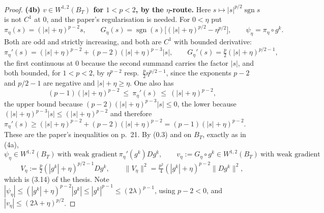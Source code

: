 \begin{proof}
\textbf{(4b) $v\in W^{1,2}(B_T)$ for $1<p<2$, by the $\eta$-route.}  Here
$s\mapsto|s|^{p/2}\operatorname{sgn}s$ is not $C^1$ at $0$, and the paper's
regularisation is needed.  For $0<\eta$ put
\[
\pi_\eta(s)=(|s|+\eta)^{p-2}s,\qquad
G_\eta(s)=\operatorname{sgn}(s)\bigl[(|s|+\eta)^{p/2}-\eta^{p/2}\bigr],
\qquad
\psi_\eta=\pi_\eta\circ g^k .
\]
Both are odd and strictly increasing, and both are $C^1$ with bounded
derivative:
\[
\pi_\eta'(s)=(|s|+\eta)^{p-2}+(p-2)(|s|+\eta)^{p-3}|s|,
\qquad
G_\eta'(s)=\tfrac p2(|s|+\eta)^{p/2-1},
\]
the first continuous at $0$ because the second summand carries the factor $|s|$,
and both bounded, for $1<p<2$, by $\eta^{p-2}$ resp.\ $\tfrac p2\eta^{p/2-1}$,
since the exponents $p-2$ and $p/2-1$ are negative and $|s|+\eta\ge\eta$.  One
also has
\[
(p-1)(|s|+\eta)^{p-2}\ \le\ \pi_\eta'(s)\ \le\ (|s|+\eta)^{p-2} ,
\tag{4.3}
\]
the upper bound because $(p-2)(|s|+\eta)^{p-3}|s|\le0$, the lower because
$(|s|+\eta)^{p-3}|s|\le(|s|+\eta)^{p-2}$ and therefore
$\pi_\eta'(s)\ge(|s|+\eta)^{p-2}+(p-2)(|s|+\eta)^{p-2}=(p-1)(|s|+\eta)^{p-2}$.
These are the paper's inequalities on p.~21.  By (0.3) and
 on $B_T$, exactly as in (4a),
\[
\psi_\eta\in W^{1,2}(B_T)\ \text{with weak gradient}\ \pi_\eta'(g^k)Dg^k,
\qquad
v_\eta:=G_\eta\circ g^k\in W^{1,2}(B_T)\ \text{with weak gradient}
\]
\[
V_\eta:=\tfrac p2(|g^k|+\eta)^{p/2-1}Dg^k,
\qquad
\|V_\eta\|^2=\tfrac{p^2}4(|g^k|+\eta)^{p-2}\|Dg^k\|^2 ,
\tag{4.4}
\]
which is (3.14) of the thesis.  Note $|\psi_\eta|\le(|g^k|+\eta)^{p-2}|g^k|\le
|g^k|^{p-1}\le(2\lambda)^{p-1}$, using $p-2<0$, and $|v_\eta|\le(2\lambda+\eta)^{p/2}$.


\end{proof}
